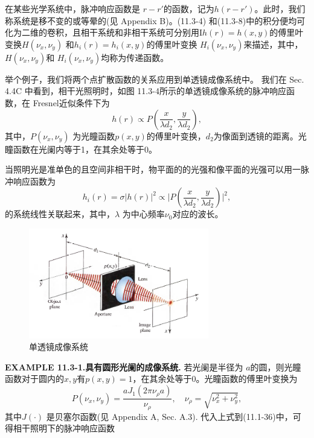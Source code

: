 \documentclass[UTF8]{ctexart}
\newcommand\crule[3][black]{\textcolor{#1}{\rule{#2}{#3}}}
\numberwithin{figure}{subsection}
\numberwithin{table}{subsection}
\begin{document}
\par 在某些光学系统中，脉冲响应函数是 $r-r'$的函数，记为$h(r - r')$。此时，我们称系统是移不变的或等晕的(见 Appendix B)。(11.3-4) 和(11.3-8)中的积分便均可化为二维的卷积，且相干系统和非相干系统可分别用I$h(r) = h(x,y)$的傅里叶变换$H(\nu_x, \nu_y)$ 和$h_i (r) = h_i (x,y)$的傅里叶变换 $H_i(\nu_x, \nu_y)$来描述，其中，$H(\nu_x, \nu_y)$和 $H_i(\nu_x, \nu_y)$均称为传递函数。
\par 举个例子，我们将两个点扩散函数的关系应用到单透镜成像系统中。 我们在 Sec. 4.4C 中看到，相干光照明时，如图 11.3-4所示的单透镜成像系统的脉冲响应函数，在 Fresnel近似条件下为
\begin{equation}
h(r) \propto P(\frac{x}{\lambda d_2}, \frac{y}{\lambda d_2}) ,
\end{equation}
其中，$P(\nu_x, \nu_y)$ 为光瞳函数$p(x, y)$的傅里叶变换，$d_2$为像面到透镜的距离。光瞳函数在光阑内等于1，在其余处等于0。
\par 当照明光是准单色的且空间非相干时，物平面的的光强和像平面的光强可以用一脉冲响应函数为
\begin{equation}
h_i (r) = \sigma \lvert h(r) \rvert ^2 \propto \lvert P(\frac{x}{\lambda d_2}, \frac{y}{\lambda d_2}) \rvert ^2 ,
\end{equation}
的系统线性关联起来，其中，$\lambda$ 为中心频率$\nu_0$对应的波长。\\
\begin{figure}[H]
\centering
\includegraphics[width=0.7\textwidth]{11_3_4.PNG}
\caption{单透镜成像系统}
\label{fig: 11_3_4}
\end{figure}
\noindent{\crule[ksc]{\textwidth}{0.1cm}}
\textbf{EXAMPLE 11.3-1.具有圆形光阑的成像系统.} 若光阑是半径为 $a$的圆，则光瞳函数对于圆内的$x,y$有$p(x,y) = 1$，在其余处等于0。光瞳函数的傅里叶变换为
\begin{equation}
P(\nu_x, \nu_y) = \frac{a J_1 (2\pi \nu_\rho a)}{\nu_\rho} , \quad \nu_\rho = \sqrt{\nu_x^2 + \nu_y^2} ,
\end{equation}
其中$J(\cdot)$ 是贝塞尔函数(见 Appendix A, Sec. A.3). 代入上式到(11.1-36)中，可得相干照明下的脉冲响应函数
\end{document}
